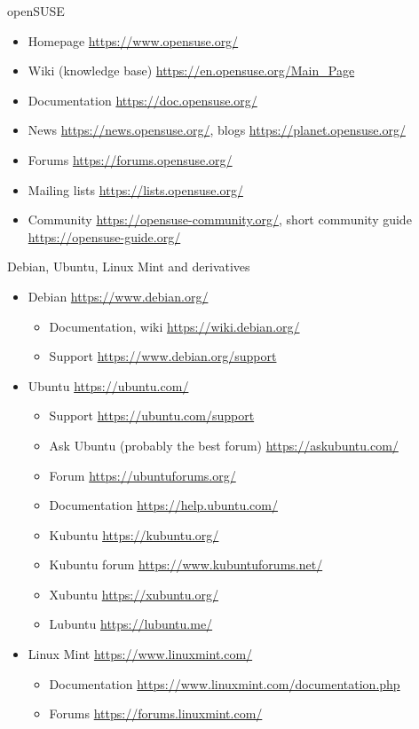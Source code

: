 \documentclass[compress, xelatex, 11pt, xcolor=svgnames, aspectratio=169, url={hyphens, lowtilde}]{beamer}
\begin{document}
\begin{frame}{openSUSE}
	\begin{itemize}
		\item Homepage \url{https://www.opensuse.org/}
		\item Wiki (knowledge base) \url{https://en.opensuse.org/Main_Page}
		\item Documentation \url{https://doc.opensuse.org/}
		\item News \url{https://news.opensuse.org/}, blogs \url{https://planet.opensuse.org/}
		\item Forums \url{https://forums.opensuse.org/}
		\item Mailing lists \url{https://lists.opensuse.org/}
		\item Community \url{https://opensuse-community.org/}, short community guide \url{https://opensuse-guide.org/}
	\end{itemize}
\end{frame}

\begin{frame}{Debian, Ubuntu, Linux Mint and derivatives}
	\begin{itemize}
		\item Debian \url{https://www.debian.org/}
		\begin{itemize}
			\item Documentation, wiki \url{https://wiki.debian.org/}
			\item Support \url{https://www.debian.org/support}
		\end{itemize}
		\item Ubuntu \url{https://ubuntu.com/}
		\begin{itemize}
			\item Support \url{https://ubuntu.com/support}
			\item Ask Ubuntu (probably the best forum) \url{https://askubuntu.com/}
			\item Forum \url{https://ubuntuforums.org/}
			\item Documentation \url{https://help.ubuntu.com/}
			\item Kubuntu \url{https://kubuntu.org/}
			\item Kubuntu forum \url{https://www.kubuntuforums.net/}
			\item Xubuntu \url{https://xubuntu.org/}
			\item Lubuntu \url{https://lubuntu.me/}
		\end{itemize}
		\item Linux Mint \url{https://www.linuxmint.com/}
		\begin{itemize}
			\item Documentation \url{https://www.linuxmint.com/documentation.php}
			\item Forums \url{https://forums.linuxmint.com/}
		\end{itemize}
	\end{itemize}
\end{frame}
\end{document}
